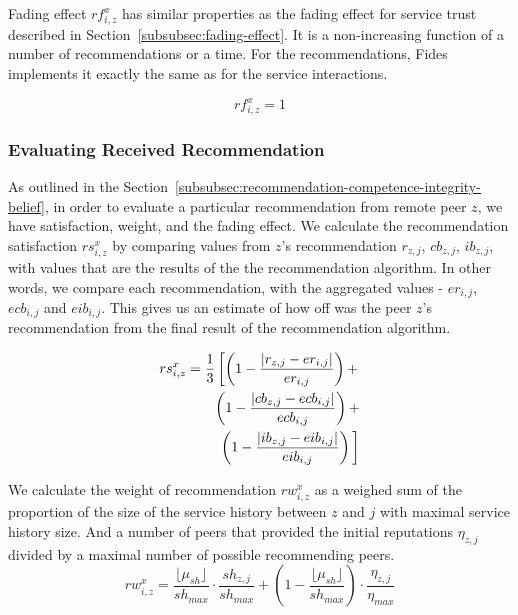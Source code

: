 Fading effect $rf^{x}_{i, z}$ has similar properties as the fading effect for service trust described in Section~\ref{subsubsec:fading-effect}. It is a non-increasing function of a number of recommendations or a time. 
For the recommendations, Fides implements it exactly the same as for the service interactions.

\begin{equation}
    rf^{x}_{i, z} = 1
\end{equation}

\subsubsection{Evaluating Received Recommendation}
As outlined in the Section~\ref{subsubsec:recommendation-competence-integrity-belief}, in order to evaluate a particular recommendation from remote peer $z$, we have satisfaction, weight, and the fading effect. 
We calculate the recommendation satisfaction $rs^{x}_{i,z}$ by comparing values from $z$'s recommendation $r_{z,j}$, $cb_{z,j}$, $ib_{z,j}$, with values that are the results of the the recommendation algorithm.
In other words, we compare each recommendation, with the aggregated values - $er_{i,j}$, $ecb_{i,j}$ and $eib_{i,j}$. This gives us an estimate of how off was the peer $z$'s recommendation from the final result of the recommendation algorithm.

\begin{equation}
\begin{split}
    rs^{x}_{i,z} = \frac{1}{3} \left[ \left(1-\frac{\left|r_{z, j} - er_{i,j}\right|}{er_{i,j}}\right) + \right. \\
    \left(1 - \frac{\left|cb_{z, j} - ecb_{i, j}\right|}{ecb_{i, j}}\right) + \\
    \left. \left(1 - \frac{\left|ib_{z, j} - eib_{i, j}\right|}{eib_{i, j}}\right)\vphantom{\frac{1}{2}}\right]
\end{split}
\end{equation}

We calculate the weight of recommendation $rw^{x}_{i,z}$ as a weighed sum of the proportion of the size of the service history between $z$ and $j$ with maximal service history size. And a number of peers that provided the initial reputations $\eta_{z,j}$ divided by a maximal number of possible recommending peers.
\begin{equation}
    rw^{x}_{i,z} = \frac{\lfloor\mu_{sh}\rfloor}{sh_{max}} \cdot \frac{sh_{z, j}}{sh_{max}} + \left(1 - \frac{\lfloor\mu_{sh}\rfloor}{sh_{max}}\right) \cdot \frac{\eta_{z,j}}{\eta_{max}}
\end{equation}
